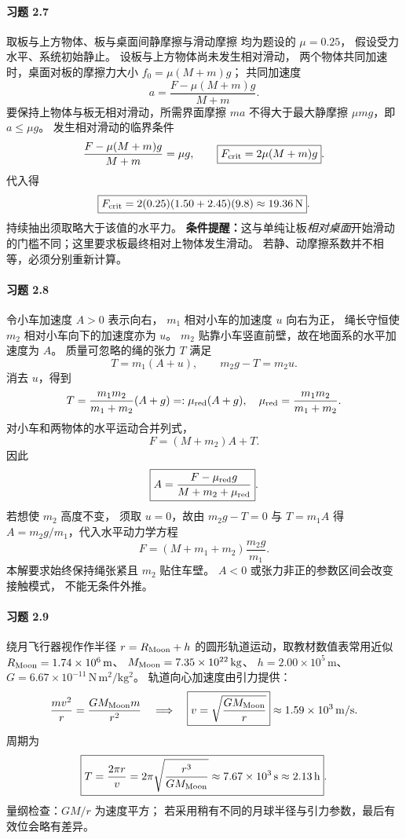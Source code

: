 \paragraph{习题 2.7}
取板与上方物体、板与桌面间静摩擦与滑动摩擦
均为题设的 \(\mu=0.25\)，
假设受力水平、系统初始静止。
设板与上方物体尚未发生相对滑动，
两个物体共同加速时，桌面对板的摩擦力大小
\(f_0=\mu(M+m)g\)；
共同加速度
\[
 a=\frac{F-\mu(M+m)g}{M+m}.
\]
要保持上物体与板无相对滑动，所需界面摩擦
\(ma\) 不得大于最大静摩擦
\(\mu mg\)，即 \(a\le\mu g\)。
发生相对滑动的临界条件
\[
 \frac{F-\mu(M+m)g}{M+m}=\mu g,
 \qquad
 \boxed{F_{\rm crit}=2\mu(M+m)g}.
\]
代入得
\[
 \boxed{F_{\rm crit}=2(0.25)(1.50+2.45)(9.8)
 \approx19.36\,\mathrm N}.
\]
持续抽出须取略大于该值的水平力。
\textbf{条件提醒：}这与单纯让板\emph{相对桌面}开始滑动
的门槛不同；这里要求板最终相对上物体发生滑动。
若静、动摩擦系数并不相等，必须分别重新计算。

\paragraph{习题 2.8}
令小车加速度 \(A>0\) 表示向右，
\(m_1\) 相对小车的加速度 \(u\) 向右为正，
绳长守恒使 \(m_2\) 相对小车向下的加速度亦为 \(u\)。
\(m_2\) 贴靠小车竖直前壁，故在地面系的水平加速度为 \(A\)。
质量可忽略的绳的张力 \(T\) 满足
\[
 T=m_1(A+u),\qquad m_2g-T=m_2u.
\]
消去 \(u\)，得到
\[
 T=\frac{m_1m_2}{m_1+m_2}(A+g)
 =:\mu_{\rm red}(A+g),\quad
 \mu_{\rm red}=\frac{m_1m_2}{m_1+m_2}.
\]
对小车和两物体的水平运动合并列式，
\[
 F=(M+m_2)A+T.
\]
因此
\[
 \boxed{A=\frac{F-\mu_{\rm red}g}
 {M+m_2+\mu_{\rm red}}}.
\]
若想使 \(m_2\) 高度不变，
须取 \(u=0\)，故由 \(m_2g-T=0\) 与
\(T=m_1A\) 得
\(A=m_2g/m_1\)，代入水平动力学方程
\[
 \boxed{F=(M+m_1+m_2)\frac{m_2g}{m_1}}.
\]
本解要求始终保持绳张紧且 \(m_2\) 贴住车壁。
\(A<0\) 或张力非正的参数区间会改变接触模式，
不能无条件外推。

\paragraph{习题 2.9}
绕月飞行器视作作半径
\(r=R_{\rm Moon}+h\) 的圆形轨道运动，取教材数值表常用近似
\(R_{\rm Moon}=1.74\times10^6\,\mathrm m\)、
\(M_{\rm Moon}=7.35\times10^{22}\,\mathrm{kg}\)、
\(h=2.00\times10^5\,\mathrm m\)、
\(G=6.67\times10^{-11}\,\mathrm{N\,m^2/kg^2}\)。
轨道向心加速度由引力提供：
\[
 \frac{mv^2}{r}=\frac{GM_{\rm Moon}m}{r^2}
 \quad\Longrightarrow\quad
 \boxed{v=\sqrt{\frac{GM_{\rm Moon}}r}}
 \approx1.59\times10^3\,\mathrm{m/s}.
\]
周期为
\[
 \boxed{T=\frac{2\pi r}{v}
 =2\pi\sqrt{\frac{r^3}{GM_{\rm Moon}}}
 \approx7.67\times10^3\,\mathrm s
 \approx2.13\,\mathrm h}.
\]
量纲检查：\(GM/r\) 为速度平方；
若采用稍有不同的月球半径与引力参数，最后有效位会略有差异。

